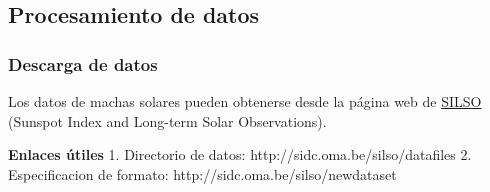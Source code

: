 \documentclass[11pt]{article}
\begin{document}
    \hypertarget{procesamiento-de-datos}{%
\subsection{Procesamiento de datos}\label{procesamiento-de-datos}}

    \hypertarget{descarga-de-datos}{%
\subsubsection{Descarga de datos}\label{descarga-de-datos}}

    Los datos de machas solares pueden obtenerse desde la página web de
\href{http://www.sidc.be/silso}{SILSO} (Sunspot Index and Long-term
Solar Observations).

\textbf{Enlaces útiles} 1. Directorio de datos:
http://sidc.oma.be/silso/datafiles 2. Especificacion de formato:
http://sidc.oma.be/silso/newdataset
\end{document}
